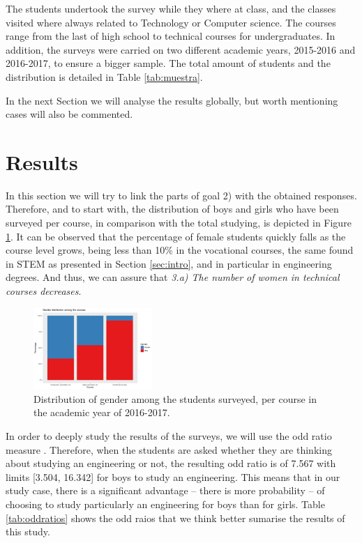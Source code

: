 \documentclass[journal,transmag]{IEEEtran}
\begin{document}
The students undertook the survey while they where at class, and the classes visited where always related to Technology or Computer science. The courses range from the last of high school to technical courses for undergraduates. In addition, the surveys were carried on two different academic years, 2015-2016 and 2016-2017, to ensure a bigger sample. The total amount of students and the distribution is detailed in Table \ref{tab:muestra}.

In the next Section we will analyse the results globally, but worth mentioning cases will also be commented.

\section{Results}
\label{sec:results}

In this section we will try to link the parts of goal 2) with the obtained responses. Therefore, and to start with, the distribution of boys and girls who have been surveyed per course, in comparison with the total studying, is depicted in Figure \ref{fig:alumni}. It can be observed that the percentage of female students quickly falls as the course level grows, being less than 10\% in the vocational courses, the same found in STEM as presented in Section \ref{sec:intro}, and in particular in engineering degrees. And thus, we can assure that \textit{3.a) The number of women in technical courses decreases}.

\begin{figure}
  \centering
  \includegraphics[width=0.4\textwidth]{img/gender_distribution.pdf}
  \caption{Distribution of gender among the students surveyed, per course in the academic year of 2016-2017.}
  \label{fig:alumni}
\end{figure}

In order to deeply study the results of the surveys, we will use the odd ratio measure \cite{bibid}. Therefore, when the students are asked whether they are thinking about studying an engineering or not, the resulting odd ratio is of 7.567 with limits [3.504, 16.342] for boys to study an engineering. This means that in our study case, there is a significant advantage -- there is more probability -- of choosing to study particularly an engineering for boys than for girls. Table \ref{tab:oddratios} shows the odd raios that we think better sumarise the results of this study.
\end{document}
